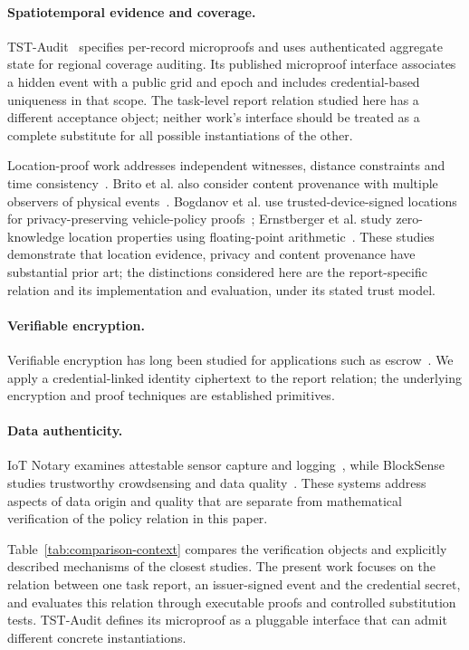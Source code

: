 \documentclass[pdflatex,iicol,sn-mathphys-num]{sn-jnl}
\begin{document}
\paragraph{Spatiotemporal evidence and coverage.} TST-Audit~\citep{He2026TSTAudit} specifies per-record microproofs and uses authenticated aggregate state for regional coverage auditing. Its published microproof interface associates a hidden event with a public grid and epoch and includes credential-based uniqueness in that scope. The task-level report relation studied here has a different acceptance object; neither work's interface should be treated as a complete substitute for all possible instantiations of the other.

Location-proof work addresses independent witnesses, distance constraints and time consistency~\citep{Brito2025DecentralizedPoL}. Brito et al. also consider content provenance with multiple observers of physical events~\citep{Brito2026ContentProvenance}. Bogdanov et al. use trusted-device-signed locations for privacy-preserving vehicle-policy proofs~\citep{Bogdanov2025VehiclePolicy}; Ernstberger et al. study zero-knowledge location properties using floating-point arithmetic~\citep{Ernstberger2025ZKLP}. These studies demonstrate that location evidence, privacy and content provenance have substantial prior art; the distinctions considered here are the report-specific relation and its implementation and evaluation, under its stated trust model.

\paragraph{Verifiable encryption.} Verifiable encryption has long been studied for applications such as escrow~\citep{CamenischShoup2003}. We apply a credential-linked identity ciphertext to the report relation; the underlying encryption and proof techniques are established primitives.

\paragraph{Data authenticity.} IoT Notary examines attestable sensor capture and logging~\citep{Panwar2022IoTNotary}, while BlockSense studies trustworthy crowdsensing and data quality~\citep{Huang2024BlockSense}. These systems address aspects of data origin and quality that are separate from mathematical verification of the policy relation in this paper.

Table~\ref{tab:comparison-context} compares the verification objects and explicitly described mechanisms of the closest studies. The present work focuses on the relation between one task report, an issuer-signed event and the credential secret, and evaluates this relation through executable proofs and controlled substitution tests. TST-Audit defines its microproof as a pluggable interface that can admit different concrete instantiations.
\end{document}
